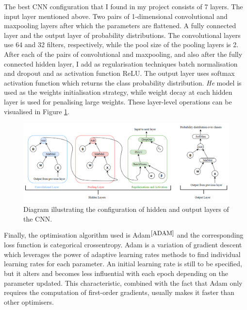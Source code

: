 The best CNN configuration that I found in my project consists of 7 layers. The input layer mentioned above. Two pairs of 1-dimensional convolutional and maxpooling layers after which the parameters are flattened. A fully connected layer and the output layer of probability distributions. The convolutional layers use 64 and 32 filters, respectively, while the pool size of the pooling layers is 2. \\

After each of the pairs of convolutional and maxpooling, and also after the fully connected hidden layer, I add as regularisation techniques batch normalisation and dropout and as activation function ReLU. The output layer uses softmax activation function which returns the class probability distribution. \textit{He} model is used as the weights initialisation strategy, while weight decay at each hidden layer is used for penalising large weights. These layer-level operations can be visualised in Figure \ref{cnn_layers}. \\

\begin{figure}[H]
  \centering
  \centerline{\includegraphics[scale=0.5]{Images/cnn_layers.png}}
  \caption{Diagram illustrating the configuration of hidden and output layers of the CNN.}
  \label{cnn_layers}
\end{figure}

Finally, the optimisation algorithm used is Adam$^{\small \cite{ADAM}}$ and the corresponding loss function is categorical crossentropy. Adam is a variation of gradient descent which leverages the power of adaptive learning rates methods to find individual learning rates for each parameter. An initial learning rate is still to be specified, but it alters and becomes less influential with each epoch depending on the parameter updated. This characteristic, combined with the fact that Adam only requires the computation of first-order gradients, usually makes it faster than other optimisers.  \\



